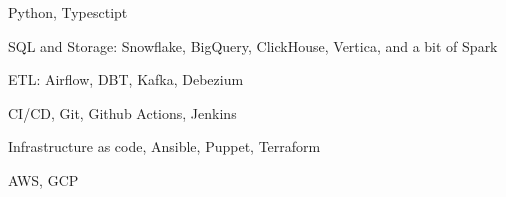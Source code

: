 \item Python, Typesctipt
\item SQL and Storage: Snowflake, BigQuery, ClickHouse, Vertica, and a bit of
  Spark
\item ETL: Airflow, DBT, Kafka, Debezium
\item CI/CD, Git, Github Actions, Jenkins
\item Infrastructure as code, Ansible, Puppet, Terraform
\item AWS, GCP

